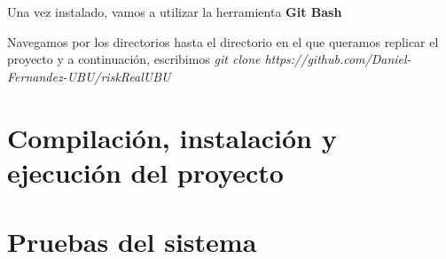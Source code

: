 Una vez instalado, vamos a utilizar la herramienta \textbf{Git Bash}

Navegamos por los directorios hasta el directorio en el que queramos replicar el proyecto y a continuación, escribimos \textit{git clone https://github.com/Daniel-Fernandez-UBU/riskRealUBU}


\section{Compilación, instalación y ejecución del proyecto}

\section{Pruebas del sistema}
